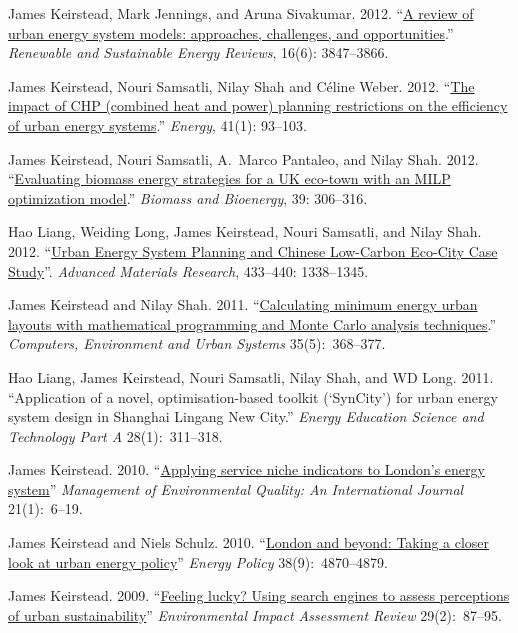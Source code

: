\documentclass[11pt,a4paper]{article}
\begin{document}
\ind James Keirstead, Mark Jennings, and Aruna Sivakumar. 2012. ``\href{http://dx.doi.org/10.1016/j.rser.2012.02.047}{A review of urban energy system models: approaches, challenges, and opportunities}.'' \emph{Renewable and Sustainable Energy Reviews}, 16(6): 3847--3866.

\ind James Keirstead, Nouri Samsatli, Nilay Shah and C\'{e}line Weber. 2012. ``\href{http://dx.doi.org/10.1016/j.energy.2011.06.011}{The impact of CHP (combined heat and power) planning restrictions on the efficiency of urban energy systems}.'' \emph{Energy}, 41(1): 93--103. 

\ind James Keirstead, Nouri Samsatli, A.\ Marco Pantaleo, and Nilay Shah. 2012. ``\href{http://dx.doi.org/10.1016/j.biombioe.2012.01.022}{Evaluating biomass energy strategies for a UK eco-town with an MILP optimization model}.'' \emph{Biomass and Bioenergy}, 39: 306--316.

\ind Hao Liang, Weiding Long, James Keirstead, Nouri Samsatli, and Nilay Shah. 2012. ``\href{http://dx.doi.org/10.4028/www.scientific.net/AMR.433-440.1338}{Urban Energy System Planning and Chinese Low-Carbon Eco-City Case Study}''. \emph{Advanced Materials Research}, 433--440: 1338--1345. 

\ind James Keirstead and Nilay Shah. 2011. ``\href{http://dx.doi.org/10.1016/j.compenvurbsys.2010.12.005}{Calculating minimum energy urban layouts with mathematical programming and Monte Carlo analysis techniques}.'' \emph{Computers, Environment and Urban Systems} 35(5):~368--377. 

\ind Hao Liang, James Keirstead, Nouri Samsatli, Nilay Shah, and WD Long. 2011. ``Application of a novel, optimisation-based toolkit (`SynCity') for urban energy system design in Shanghai Lingang New City.'' \emph{Energy Education Science and Technology Part A} 28(1):~311--318.

\ind James Keirstead. 2010. ``\href{http://dx.doi.org/10.1108/14777831011010829}{Applying service niche indicators to London's energy system}'' \emph{Management of Environmental Quality: An International Journal} 21(1):~6--19.

\ind James Keirstead and Niels Schulz. 2010. ``\href{http://dx.doi.org/10.1016/j.enpol.2009.07.025}{London and beyond: Taking a closer look at urban energy policy}'' \emph{Energy Policy} 38(9):~4870--4879.

\ind James Keirstead. 2009. ``\href{http://dx.doi.org/10.1016/j.eiar.2008.09.001}{Feeling lucky? Using search engines to assess perceptions of urban sustainability}'' \emph{Environmental Impact Assessment Review} 29(2):~87--95.
\end{document}
